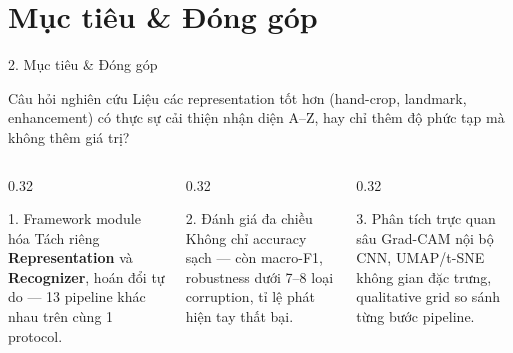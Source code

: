 \documentclass[t, aspectratio=169]{beamer} %
\begin{document}
	\section{Mục tiêu \& Đóng góp}
	\begin{frame}{2. Mục tiêu \& Đóng góp}
		\begin{block}{Câu hỏi nghiên cứu}
			Liệu các representation tốt hơn (hand-crop, landmark, enhancement) có thực sự cải thiện nhận diện A--Z, hay chỉ thêm độ phức tạp mà không thêm giá trị?
		\end{block}

		\vspace{1em}

		\begin{columns}[T]
			\begin{column}{0.32\textwidth}
				\begin{block}{1. Framework module hóa}
					\small Tách riêng \textbf{Representation} và \textbf{Recognizer}, hoán đổi tự do — 13 pipeline khác nhau trên cùng 1 protocol.
				\end{block}
			\end{column}
			\begin{column}{0.32\textwidth}
				\begin{block}{2. Đánh giá đa chiều}
					\small Không chỉ accuracy sạch — còn macro-F1, robustness dưới 7--8 loại corruption, tỉ lệ phát hiện tay thất bại.
				\end{block}
			\end{column}
			\begin{column}{0.32\textwidth}
				\begin{block}{3. Phân tích trực quan sâu}
					\small Grad-CAM nội bộ CNN, UMAP/t-SNE không gian đặc trưng, qualitative grid so sánh từng bước pipeline.
				\end{block}
			\end{column}
		\end{columns}
	\end{frame}

\end{document}
